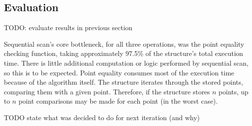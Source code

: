 \subsection{Evaluation}

TODO: evaluate results in previous section

 Sequential scan's core bottleneck, for all three operations, was the point equality checking function, taking approximately 97.5\% of the structure's total execution time. There is little additional computation or logic performed by sequential scan, so this is to be expected. Point equality consumes most of the execution time because of the algorithm itself. The structure iterates through the stored points, comparing them with a given point. Therefore, if the structure stores $n$ points, up to $n$ point comparisons may be made for each point (in the worst case).

TODO state what was decided to do for next iteration (and why)

